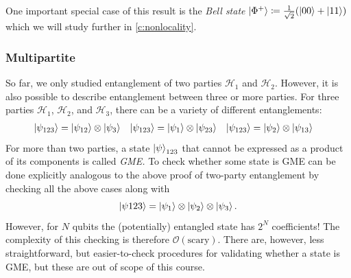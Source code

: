 			One important special case of this result is the \emph{Bell state} \(\ket{\Phi^+} \coloneqq \frac{1}{\sqrt{2}} (\ket{00} + \ket{11})\) which we will study further in \autoref{c:nonlocality}.

			\subsubsection{Multipartite}
				So far, we only studied entanglement of two parties \(\mathcal{H}_1\) and \(\mathcal{H}_2\). However, it is also possible to describe entanglement between three or more parties. For three parties \(\mathcal{H}_1\), \(\mathcal{H}_2\), and \(\mathcal{H}_3\), there can be a variety of different entanglements:
				\begin{align}
					\ket{\psi_{123}} &= \ket{\psi_{12}} \otimes \ket{\psi_3} &
					\ket{\psi_{123}} &= \ket{\psi_1} \otimes \ket{\psi_{23}} &
					\ket{\psi_{123}} &= \ket{\psi_2} \otimes \ket{\psi_{13}}
				\end{align}
				For more than two parties, a state \(\ket{\psi}_{123}\) that cannot be expressed as a product of its components is called \emph{\ac{GME}.} To check whether some state is \ac{GME} can be done explicitly analogous to the above proof of two-party entanglement by checking all the above cases along with
				\begin{equation}
					\ket{\psi{123}} = \ket{\psi_1} \otimes \ket{\psi_2} \otimes \ket{\psi_3}.
				\end{equation}
				However, for \(N\) qubits the (potentially) entangled state has \(2^N\) coefficients! The complexity of this checking is therefore \(\mathcal{O}(\text{scary})\). There are, however, less straightforward, but easier-to-check procedures for validating whether a state is \ac{GME}, but these are out of scope of this course.

